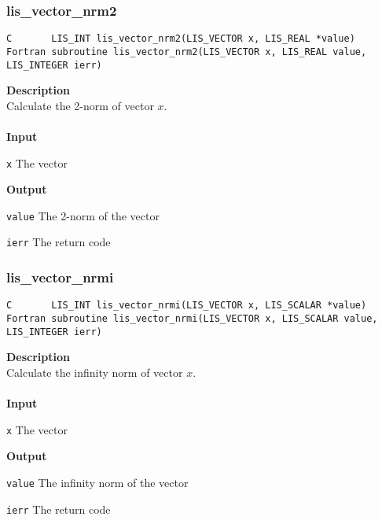\documentclass[a4paper]{article}
\newcommand{\namelistlabel}[1]{\mbox{#1}\hfill}
\newenvironment{namelist}[1]{%
\begin{list}{}
  {\let\makelabel\namelistlabel
  \settowidth{\labelwidth}{#1}
  \setlength{\leftmargin}{1.1\labelwidth}}
  }{%
\end{list}}
\begin{document}
\subsubsection{lis\_vector\_nrm2}
\begin{screen}
\verb|C       LIS_INT lis_vector_nrm2(LIS_VECTOR x, LIS_REAL *value)|\\
\verb|Fortran subroutine lis_vector_nrm2(LIS_VECTOR x, LIS_REAL value, LIS_INTEGER ierr)|
\end{screen}
{\bf Description}\\
\indent
Calculate the 2-norm of vector $x$.
\\ \\
\noindent
{\bf Input}
\begin{namelist}{XXXXXXXXXXXXXXXXXXXX}
\item[\tt x] The vector
\end{namelist}
{\bf Output}
\begin{namelist}{XXXXXXXXXXXXXXXXXXXX}
\item[\tt value] The 2-norm of the vector
\item[\tt ierr] The return code
\end{namelist}

\newpage
\subsubsection{lis\_vector\_nrmi}
\begin{screen}
\verb|C       LIS_INT lis_vector_nrmi(LIS_VECTOR x, LIS_SCALAR *value)|\\
\verb|Fortran subroutine lis_vector_nrmi(LIS_VECTOR x, LIS_SCALAR value, LIS_INTEGER ierr)|
\end{screen}
{\bf Description}\\
\indent
Calculate the infinity norm of vector $x$.
\\ \\
\noindent
{\bf Input}
\begin{namelist}{XXXXXXXXXXXXXXXXXXXX}
\item[\tt x] The vector
\end{namelist}
{\bf Output}
\begin{namelist}{XXXXXXXXXXXXXXXXXXXX}
\item[\tt value] The infinity norm of the vector
\item[\tt ierr] The return code
\end{namelist}
\end{document}
